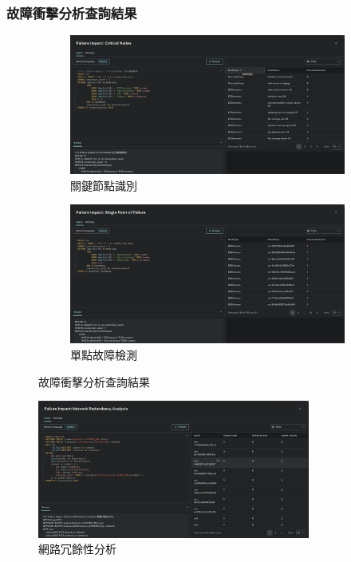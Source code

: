 \documentclass[11pt,a4paper]{ctexart}
\begin{document}
\subsubsection{故障衝擊分析查詢結果}

\begin{figure}[H]
\centering
\begin{subfigure}[b]{0.48\textwidth}
\centering
\includegraphics[width=\textwidth]{Critical Nodes.png}
\caption{關鍵節點識別}
\label{fig:critical_nodes}
\end{subfigure}
\hfill
\begin{subfigure}[b]{0.48\textwidth}
\centering
\includegraphics[width=\textwidth]{Single Point of Failure.png}
\caption{單點故障檢測}
\label{fig:spof}
\end{subfigure}
\caption{故障衝擊分析查詢結果}
\label{fig:failure_analysis_results}
\end{figure}

\begin{figure}[H]
\centering
\includegraphics[width=0.8\textwidth]{Network Redundancy Analysis.png}
\caption{網路冗餘性分析}
\label{fig:network_redundancy}
\end{figure}
\end{document}
